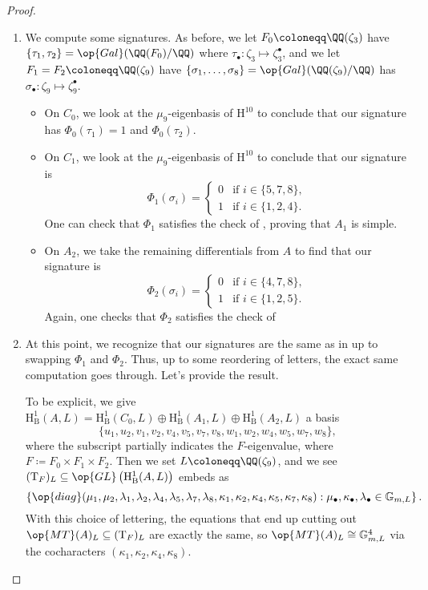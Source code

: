 \documentclass[../thesis.tex]{subfiles}
\begin{document}
\begin{proof}
\begin{enumerate}
		\item We compute some signatures. As before, we let $F_0\coloneqq\QQ(\zeta_3)$ have $\{\tau_1,\tau_2\}=\op{Gal}(\QQ(F_0)/\QQ)$ where $\tau_\bullet\colon\zeta_3\mapsto\zeta_3^\bullet$, and we let $F_1=F_2\coloneqq\QQ(\zeta_9)$ have $\{\sigma_1,\ldots,\sigma_8\}=\op{Gal}(\QQ(\zeta_9)/\QQ)$ has $\sigma_\bullet\colon\zeta_9\mapsto\zeta_9^\bullet$.
		\begin{itemize}
			\item On $C_0$, we look at the $\mu_9$-eigenbasis of $\mathrm H^{10}$ to conclude that our signature has $\Phi_0(\tau_1)=1$ and $\Phi_0(\tau_2)$.
			\item On $C_1$, we look at the $\mu_9$-eigenbasis of $\mathrm H^{10}$ to conclude that our signature is
			\[\Phi_1(\sigma_i)=\begin{cases}
				0 & \text{if }i\in\{5,7,8\}, \\
				1 & \text{if }i\in\{1,2,4\}.
			\end{cases}\]
			One can check that $\Phi_1$ satisfies the check of , proving that $A_1$ is simple.
			\item On $A_2$, we take the remaining differentials from $A$ to find that our signature is
			\[\Phi_2(\sigma_i)=\begin{cases}
				0 & \text{if }i\in\{4,7,8\}, \\
				1 & \text{if }i\in\{1,2,5\}.
			\end{cases}\]
			Again, one checks that $\Phi_2$ satisfies the check of 
		\end{itemize}

		\item At this point, we recognize that our signatures are the same as in  up to swapping $\Phi_1$ and $\Phi_2$. Thus, up to some reordering of letters, the exact same computation goes through. Let's provide the result.
		
		To be explicit, we give $\mathrm H^1_{\mathrm B}(A,L)=\mathrm H^1_{\mathrm B}(C_0,L)\oplus\mathrm H^1_{\mathrm B}(A_1,L)\oplus\mathrm H^1_{\mathrm B}(A_2,L)$ a basis
		\[\{u_1,u_2,v_1,v_2,v_4,v_5,v_7,v_8,w_1,w_2,w_4,w_5,w_7,w_8\},\]
		where the subscript partially indicates the $F$-eigenvalue, where $F\coloneqq F_0\times F_1\times F_2$. Then we set $L\coloneqq\QQ(\zeta_9)$, and we see $(\mathrm T_F)_L\subseteq\op{GL}\left(\mathrm H^1_{\mathrm B}(A,L)\right)$ embeds as
		\[\left\{\op{diag}(\mu_1,\mu_2,\lambda_1,\lambda_2,\lambda_4,\lambda_5,\lambda_7,\lambda_8,\kappa_1,\kappa_2,\kappa_4,\kappa_5,\kappa_7,\kappa_8):\mu_\bullet,\kappa_\bullet,\lambda_\bullet\in\mathbb G_{m,L}\right\}.\]
		With this choice of lettering, the equations that end up cutting out $\op{MT}(A)_L\subseteq(\mathrm T_F)_L$ are exactly the same, so $\op{MT}(A)_L\cong\mathbb G_{m,L}^4$ via the cocharacters $(\kappa_1,\kappa_2,\kappa_4,\kappa_8)$.


\end{enumerate}
\end{proof}
\end{document}
